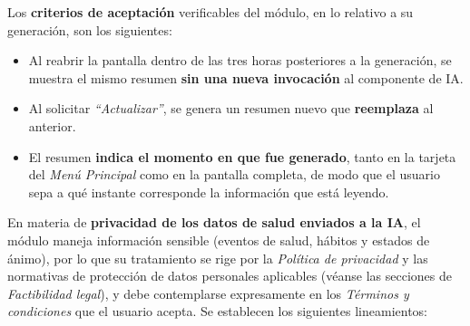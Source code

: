 \documentclass[a4paper,12pt]{article}
\begin{document}
    \par Los \textbf{criterios de aceptación} verificables del módulo, en lo relativo a su generación, son los siguientes:
    \begin{itemize}
        \item Al reabrir la pantalla dentro de las tres horas posteriores a la generación, se muestra el mismo resumen \textbf{sin una nueva invocación} al componente de IA.
        \item Al solicitar \textit{``Actualizar''}, se genera un resumen nuevo que \textbf{reemplaza} al anterior.
        \item El resumen \textbf{indica el momento en que fue generado}, tanto en la tarjeta del \textit{Menú Principal} como en la pantalla completa, de modo que el usuario sepa a qué instante corresponde la información que está leyendo.
    \end{itemize}
    \par En materia de \textbf{privacidad de los datos de salud enviados a la IA}, el módulo maneja información sensible (eventos de salud, hábitos y estados de ánimo), por lo que su tratamiento se rige por la \textit{Política de privacidad} y las normativas de protección de datos personales aplicables (véanse las secciones de \textit{Factibilidad legal}), y debe contemplarse expresamente en los \textit{Términos y condiciones} que el usuario acepta. Se establecen los siguientes lineamientos:
\end{document}
